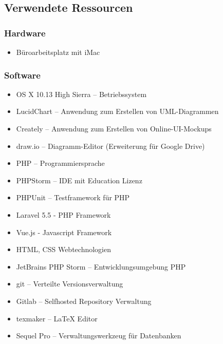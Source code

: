 \subsection{Verwendete Ressourcen}
\label{app:Ressourcen}

\subsubsection{Hardware}

\begin{itemize}
	\item Büroarbeitsplatz mit iMac
\end{itemize}

\subsubsection{Software}

\begin{itemize}
	\item OS X 10.13 High Sierra – Betriebssystem
	\item LucidChart – Anwendung zum Erstellen von \acs{UML}-Diagrammen
	\item Creately – Anwendung zum Erstellen von Online-UI-Mockups
	\item draw.io – Diagramm-Editor (Erweiterung für Google Drive)
	\item PHP – Programmiersprache
	\item PHPStorm – IDE mit Education Lizenz
	\item PHPUnit – Testframework für PHP
	\item Laravel 5.5 - \acs{PHP} Framework
	\item Vue.js - Javascript Framework
	\item \acs{HTML}, \acs{CSS} Webtechnologien
	\item JetBrains PHP Storm – Entwicklungsumgebung \acs{PHP}
	\item git – Verteilte Versionsverwaltung
	\item Gitlab – Selfhosted Repository Verwaltung
	\item texmaker – \LaTeX\xspace Editor
	\item Sequel Pro – Verwaltungswerkzeug für Datenbanken
\end{itemize}
